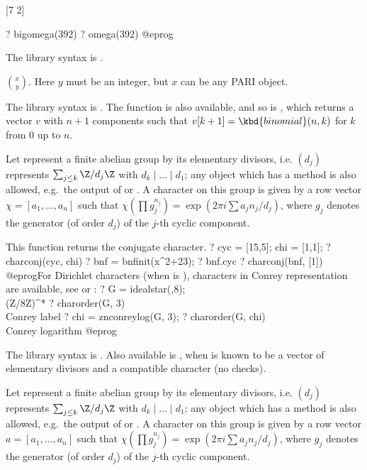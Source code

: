 [7 2]

? bigomega(392)
? omega(392)
@eprog

The library syntax is .

\label{se:binomial}
 $\binom{x}{y}$.
Here $y$ must be an integer, but $x$ can be any PARI object.

The library syntax is .
The function
 is also available, and so is
, which returns a vector $v$
with $n+1$ components such that $v[k+1] = \kbd{binomial}(n,k)$ for $k$ from
$0$ up to $n$.

\label{se:charconj}
Let  represent a finite abelian group by its elementary
divisors, i.e. $(d_j)$ represents $\sum_{j \leq k} \Z/d_j\Z$ with $d_k
\mid \dots \mid d_1$; any object which has a  method is also
allowed, e.g.~the output of  or . A character
on this group is given by a row vector $\chi = [a_1,\ldots,a_n]$ such that
$\chi(\prod g_j^{n_j}) = \exp(2\pi i\sum a_j n_j / d_j)$, where $g_j$ denotes
the generator (of order $d_j$) of the $j$-th cyclic component.

This function returns the conjugate character.
\bprog
? cyc = [15,5]; chi = [1,1];
? charconj(cyc, chi)
? bnf = bnfinit(x^2+23);
? bnf.cyc
? charconj(bnf, [1])
@eprog\noindent For Dirichlet characters (when  is
), characters in Conrey representation are available,
see  or :
\bprog
? G = idealstar(,8);  \\ (Z/8Z)^*
? charorder(G, 3)  \\ Conrey label
? chi = znconreylog(G, 3);
? charorder(G, chi)  \\ Conrey logarithm
@eprog

The library syntax is .
Also available is
, when  is known to
be a vector of elementary divisors and  a compatible character
(no checks).

\label{se:chardiv}
Let  represent a finite abelian group by its elementary
divisors, i.e. $(d_j)$ represents $\sum_{j \leq k} \Z/d_j\Z$ with $d_k
\mid \dots \mid d_1$; any object which has a  method is also
allowed, e.g.~the output of  or . A character
on this group is given by a row vector $a = [a_1,\ldots,a_n]$ such that
$\chi(\prod g_j^{n_j}) = \exp(2\pi i\sum a_j n_j / d_j)$, where $g_j$ denotes
the generator (of order $d_j$) of the $j$-th cyclic component.

